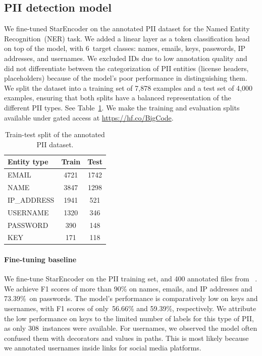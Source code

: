 \documentclass[10pt]{article} %
\begin{document}
\subsection{PII detection model}\label{sec:pii_model}
We fine-tuned StarEncoder on the annotated PII dataset for the Named Entity Recognition~(NER) task. We added a linear layer as a token classification head on top of the model, with 6~target classes: names, emails, keys, passwords, IP addresses, and usernames.  We excluded IDs due to low annotation quality and did not differentiate between the categorization of PII entities (license headers, placeholders) because of the model's poor performance in distinguishing them. We split the dataset into a training set of 7,878 examples and a test set of 4,000 examples, ensuring that both splits have a balanced representation of the different PII types. See Table~\ref{tab:pii_split}. We make the training and evaluation splits available under gated access at \url{https://hf.co/BigCode}.

\begin{table}
\centering
\begin{tabular}{lcc}
\toprule
\textbf{Entity type} & \textbf{Train} & \textbf{Test} \\

\midrule
EMAIL & 4721 & 1742 \\
NAME & 3847 & 1298 \\
IP\_ADDRESS & 1941 & 521 \\
USERNAME & 1320 & 346 \\
PASSWORD & 390 & 148 \\
KEY & 171 & 118 \\
\midrule
\end{tabular}
\caption{Train-test split of the annotated PII dataset.}
\label{tab:pii_split}
\end{table}

\paragraph{Fine-tuning baseline} We fine-tune StarEncoder on the PII training set, and 400 annotated files from ~\citet{allal2023santacoder}. We achieve F1 scores of more than 90\% on names, emails, and IP addresses and 73.39\%~on passwords. The model's performance is comparatively low on keys and usernames, with F1 scores of only~56.66\% and 59.39\%, respectively. We attribute the low performance on keys to the limited number of labels for this type of PII, as only 308~instances were available. For usernames, we observed the model often confused them with decorators and values in paths. This is most likely because we annotated usernames inside links for social media platforms. 
\end{document}
